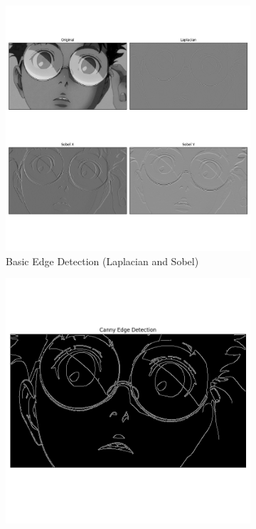 \documentclass[12pt,a4paper]{article}
\begin{document}
\begin{figure}[H]
  \centering
  \begin{subfigure}[b]{0.45\textwidth}
    \includegraphics[width=\textwidth]{edge_detection/basic_edge_detection.png}
    \caption{Basic Edge Detection (Laplacian and Sobel)}
  \end{subfigure}
  \hfill
  \begin{subfigure}[b]{0.45\textwidth}
    \includegraphics[width=\textwidth]{edge_detection/canny_edges.png}

\end{subfigure}
\end{figure}
\end{document}
